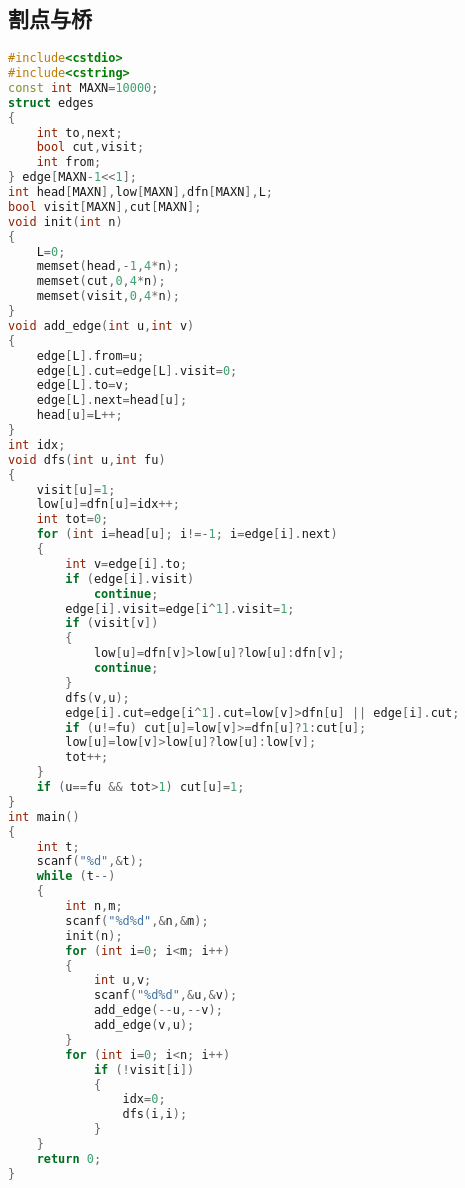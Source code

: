 \subsection{割点与桥}
    \begin{lstlisting}[language=c++]
#include<cstdio>
#include<cstring>
const int MAXN=10000;
struct edges
{
    int to,next;
    bool cut,visit;
    int from;
} edge[MAXN-1<<1];
int head[MAXN],low[MAXN],dfn[MAXN],L;
bool visit[MAXN],cut[MAXN];
void init(int n)
{
    L=0;
    memset(head,-1,4*n);
    memset(cut,0,4*n);
    memset(visit,0,4*n);
}
void add_edge(int u,int v)
{
    edge[L].from=u;
    edge[L].cut=edge[L].visit=0;
    edge[L].to=v;
    edge[L].next=head[u];
    head[u]=L++;
}
int idx;
void dfs(int u,int fu)
{
    visit[u]=1;
    low[u]=dfn[u]=idx++;
    int tot=0;
    for (int i=head[u]; i!=-1; i=edge[i].next)
    {
        int v=edge[i].to;
        if (edge[i].visit)
            continue;
        edge[i].visit=edge[i^1].visit=1;
        if (visit[v])
        {
            low[u]=dfn[v]>low[u]?low[u]:dfn[v];
            continue;
        }
        dfs(v,u);
        edge[i].cut=edge[i^1].cut=low[v]>dfn[u] || edge[i].cut;
        if (u!=fu) cut[u]=low[v]>=dfn[u]?1:cut[u];
        low[u]=low[v]>low[u]?low[u]:low[v];
        tot++;
    }
    if (u==fu && tot>1) cut[u]=1;
}
int main()
{
    int t;
    scanf("%d",&t);
    while (t--)
    {
        int n,m;
        scanf("%d%d",&n,&m);
        init(n);
        for (int i=0; i<m; i++)
        {
            int u,v;
            scanf("%d%d",&u,&v);
            add_edge(--u,--v);
            add_edge(v,u);
        }
        for (int i=0; i<n; i++)
            if (!visit[i])
            {
                idx=0;
                dfs(i,i);
            }
    }
    return 0;
}
    \end{lstlisting}